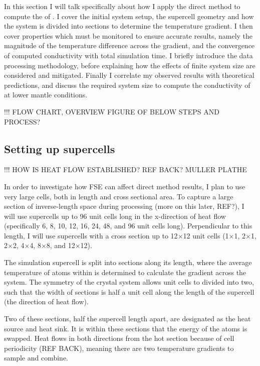 In this section I will talk specifically about how I apply the direct method to compute the \tcs of \bdg. I cover the initial system setup, the supercell geometry and how the system is divided into sections to determine the temperature gradient. I then cover properties which must be monitored to ensure accurate results, namely the magnitude of the temperature difference across the gradient, and the convergence of computed conductivity with total simulation time. I briefly introduce the data processing methodology, before explaining how the effects of finite system size are considered and mitigated. Finally I correlate my observed results with theoretical predictions, and discuss the required system size to compute the conductivity of \bdgs at lower mantle conditions.

!!! FLOW CHART, OVERVIEW FIGURE OF BELOW STEPS AND PROCESS?


\subsection{\label{sec:3.DM.cell}Setting up supercells}

!!! HOW IS HEAT FLOW ESTABLISHED? REF BACK? MULLER PLATHE

In order to investigate how FSE can affect direct method results, I plan to use very large cells, both in length and cross sectional area. To capture a large section of inverse-length space during processing (more on this later, REF?), I will use supercells up to 96 unit cells long in the x-direction of heat flow (specifically 6, 8, 10, 12, 16, 24, 48, and 96 unit cells long). Perpendicular to this length, I will use supercells with a cross section up to 12$\times$12 unit cells (1$\times$1, 2$\times$1, 2$\times$2, 4$\times$4, 8$\times$8, and 12$\times$12).

The simulation supercell is split into sections along its length, where the average temperature of atoms within is determined to calculate the gradient across the system. The symmetry of the \bdgs crystal system allows unit cells to divided into two, such that the width of sections is half a unit cell along the length of the supercell (the direction of heat flow). 

Two of these sections, half the supercell length apart, are designated as the heat source and heat sink. It is within these sections that the energy of the atoms is swapped. Heat flows in both directions from the hot section because of cell periodicity (REF BACK), meaning there are two temperature gradients to sample and combine. 

